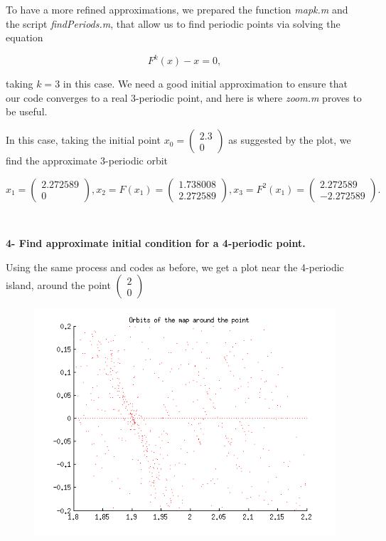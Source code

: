 \documentclass[twoside]{article}
\begin{document}
To have a more refined approximations, we prepared the function {\it mapk.m} and the script {\it findPeriods.m}, that allow us to find periodic points via solving the equation

$$F^k(x) - x = 0 ,$$

taking $k=3$ in this case. We need a good initial approximation to ensure that our code converges to a real 3-periodic point, and here is where {\it zoom.m} proves to be useful.

In this case, taking the initial point $x_0 =  \begin{pmatrix} 2.3 \\ 0 \end{pmatrix}$ as suggested by the plot, we find the approximate 3-periodic orbit

$$x_1 =  \begin{pmatrix} 2.272589 \\ 0 \end{pmatrix} , x_2 = F(x_1) =  \begin{pmatrix} 1.738008 \\ 2.272589 \end{pmatrix} , x_3 = F^2(x_1) =  \begin{pmatrix} 2.272589 \\ -2.272589 \end{pmatrix} .$$

\

{\bf 4- Find approximate initial condition for a 4-periodic point.}

Using the same process and codes as before, we get a plot near the 4-periodic island, around the point $\begin{pmatrix} 2 \\ 0 \end{pmatrix}$

\begin{figure}[ht]
\includegraphics[scale=0.36]{zoom4.png}
\end{figure}
\end{document}
